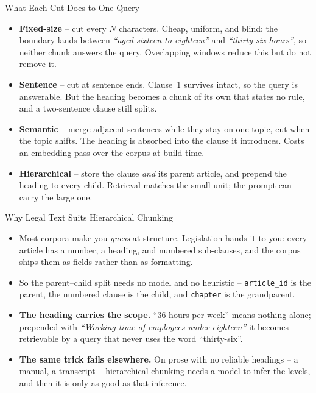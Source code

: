 \begin{frame}{What Each Cut Does to One Query}
\small
\begin{itemize}
  \item \textbf{Fixed-size} -- cut every $N$ characters. Cheap, uniform, and blind: the boundary lands between \emph{``aged sixteen to eighteen''} and \emph{``thirty-six hours''}, so neither chunk answers the query. Overlapping windows reduce this but do not remove it.
  \pause
  \item \textbf{Sentence} -- cut at sentence ends. Clause~1 survives intact, so the query is answerable. But the heading becomes a chunk of its own that states no rule, and a two-sentence clause still splits.
  \pause
  \item \textbf{Semantic} -- merge adjacent sentences while they stay on one topic, cut when the topic shifts. The heading is absorbed into the clause it introduces. Costs an embedding pass over the corpus at build time.
  \pause
  \item \textbf{Hierarchical} -- store the clause \emph{and} its parent article, and prepend the heading to every child. Retrieval matches the small unit; the prompt can carry the large one.
\end{itemize}
\end{frame}

\begin{frame}{Why Legal Text Suits Hierarchical Chunking}
\begin{itemize}
  \item Most corpora make you \emph{guess} at structure. Legislation hands it to you: every article has a number, a heading, and numbered sub-clauses, and the corpus ships them as fields rather than as formatting.
  \pause
  \item So the parent--child split needs no model and no heuristic -- \texttt{article\_id} is the parent, the numbered clause is the child, and \texttt{chapter} is the grandparent.
  \pause
  \item \textbf{The heading carries the scope.} ``36 hours per week'' means nothing alone; prepended with \emph{``Working time of employees under eighteen''} it becomes retrievable by a query that never uses the word ``thirty-six''.
  \pause
  \item \textbf{The same trick fails elsewhere.} On prose with no reliable headings -- a manual, a transcript -- hierarchical chunking needs a model to infer the levels, and then it is only as good as that inference.
\end{itemize}
\end{frame}

